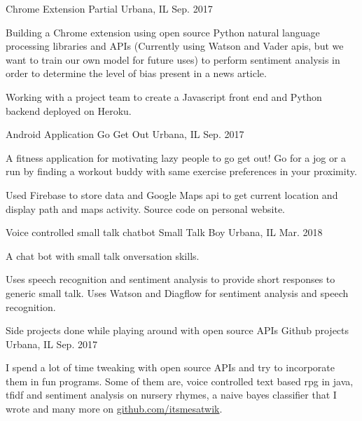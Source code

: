 \begin{cventries}
  \cventry
    {Chrome Extension}
    {Partial}
    {Urbana, IL}
    {Sep. 2017}
    {
        \begin{cvitems}
          \item {Building a Chrome extension using open source Python natural language processing libraries and APIs (Currently using Watson and Vader apis, but we want to train our own model for future uses) to perform sentiment analysis in order to determine the level of bias present in a news article.}
          \item {Working with a project team to create a Javascript front end and Python backend deployed on Heroku.}
          \end{cvitems}
          \vspace*{-0.25cm}
    }
    \cventry
    {Android Application}
    {Go Get Out}
    {Urbana, IL}
    {Sep. 2017}
    {
        \begin{cvitems}
          \item {A fitness application for motivating lazy people to go get out! Go for a jog or a run by finding a workout buddy with same exercise preferences in your proximity.}
          \item {Used Firebase to store data and Google Maps api to get current location and display path and maps activity. Source code on personal website.}
          \end{cvitems}
          \vspace*{0.45cm}
    }
    \cventry
    {Voice controlled small talk chatbot}
    {Small Talk Boy}
    {Urbana, IL}
    {Mar. 2018}
    {
        \begin{cvitems}
          \item {A chat bot with small talk onversation skills.}
          \item {Uses speech recognition and sentiment analysis to provide short responses to generic small talk. Uses Watson and Diagflow for sentiment analysis and speech recognition.}
          \end{cvitems}
          \vspace*{0.45cm}
    }
    \cventry
    {Side projects done while playing around with open source APIs}
    {Github projects}
    {Urbana, IL}
    {Sep. 2017}
    {
        \begin{cvitems}
          \item {I spend a lot of time tweaking with open source APIs and try to incorporate them in fun programs. Some of them are, voice controlled text based rpg in java, tfidf and sentiment analysis on nursery rhymes, a naive bayes classifier that I wrote and many more on \url{github.com/itsmesatwik}.}
          \end{cvitems}
    }
\end{cventries}
